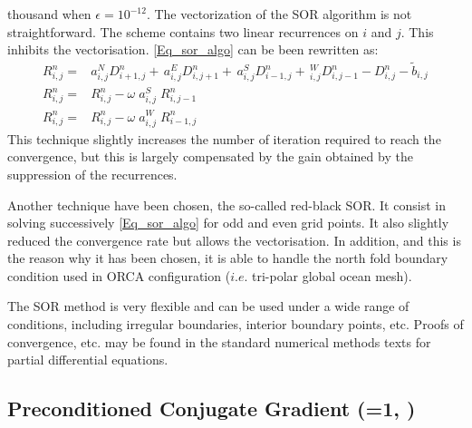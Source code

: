 thousand when $\epsilon = 10^{-12}$.
The vectorization of the SOR algorithm is not straightforward. The scheme
contains two linear recurrences on $i$ and $j$. This inhibits the vectorisation. 
\eqref{Eq_sor_algo} can be been rewritten as:
\begin{equation} 
\begin{split}
R_{i,j}^n
= &a_{i,j}^{N}  D_{i+1,j}^n +\,a_{i,j}^{E}  D_{i,j+1} ^n
 +\,a_{i,j}^{S}  D_{i-1,j} ^{n}+\,_{i,j}^{W} D_{i,j-1} ^{n} -  D_{i,j}^n - \tilde{b}_{i,j}      \\
R_{i,j}^n = &R_{i,j}^n - \omega \;a_{i,j}^{S}\; R_{i,j-1}^n                                             \\
R_{i,j}^n = &R_{i,j}^n - \omega \;a_{i,j}^{W}\; R_{i-1,j}^n
\end{split}
\end{equation}
This technique slightly increases the number of iteration required to reach the convergence,
but this is largely compensated by the gain obtained by the suppression of the recurrences.

Another technique have been chosen, the so-called red-black SOR. It consist in solving successively 
\eqref{Eq_sor_algo} for odd and even grid points. It also slightly reduced the convergence rate
but allows the vectorisation. In addition, and this is the reason why it has been chosen, it is able to handle the north fold boundary condition used in ORCA configuration ($i.e.$ tri-polar global ocean mesh).

The SOR method is very flexible and can be used under a wide range of conditions, 
including irregular boundaries, interior boundary points, etc. Proofs of convergence, etc. 
may be found in the standard numerical methods texts for partial differential equations.

\subsection{Preconditioned Conjugate Gradient  (=1, ) }
\label{MISC_solpcg}

